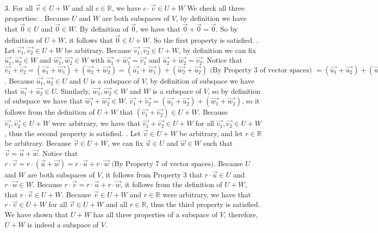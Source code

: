 \documentclass[12pt]{article}
\newenvironment{problem}[2][Problem]
{
	\begin{trivlist} 
		\item[\hskip \labelsep {\bfseries #1 #2:}]
	}
{
	\end{trivlist}
	}
\newenvironment{solution}[1][Solution]
{
	\begin{trivlist} 
		\item[\hskip \labelsep {\itshape #1:}]
	}
	{
	\end{trivlist}
}
\begin{document}
\begin{problem}{3}
\begin{solution}
3. For all $\vec{v} \in U+W$ and all $c \in \mathbb{R}$, we have $c\cdot \vec{v} \in U+W$
\noindent
\newline
\newline
We check all three properties:
\newline
{}. Because $U$ and $W$ are both subspaces of $V$, by definition we have that $\vec{0} \in U$ and $\vec{0} \in W$. By definition of $\vec{0}$, we have that $\vec{0} + \vec{0} = \vec{0}$. So by definition of $U+W$, it follows that $\vec{0} \in U+W$. So the first property is satisfied.
\newline
{}. Let $\vec{v_1},\vec{v_2} \in U+W$ be arbitrary. Because $\vec{v_1},\vec{v_2} \in U+W$, by definition we can fix $\vec{u_1},\vec{u_2} \in W$ and $\vec{w_1},\vec{w_2} \in W$ with $\vec{u_1} + \vec{w_1} = \vec{v_1}$ and $\vec{u_2} + \vec{w_2} = \vec{v_2}$. Notice that $
\vec{v_1} + \vec{v_2} =(\vec{u_1} + \vec{w_1}) + (\vec{u_2} + \vec{w_2}) = (\vec{u_1} + \vec{w_1}) + (\vec{w_2} + \vec{u_2}) \text{ (By Property 3 of vector spaces) } =(\vec{u_1} + \vec{u_2}) + (\vec{w_1} + \vec{w_2}) \text{ (By Property 4 of vector spaces)}$.
Because $\vec{u_1},\vec{u_2} \in U$ and $U$ is a subspace of $V$, by definition of subspace we have that $\vec{u_1}+\vec{u_2} \in U$. Similarly, $\vec{w_1},\vec{w_2} \in W$ and $W$ is a subspace of $V$, so by definition of subspace we have that $\vec{w_1}+\vec{w_2} \in W$. $\vec{v_1} + \vec{v_2} = (\vec{u_1} + \vec{u_2}) + (\vec{w_1} + \vec{w_2})$, so it follows from the definition of $U+W$ that $(\vec{v_1} + \vec{v_2}) \in U+W$. Because $\vec{v_1},\vec{v_2} \in U+W$ were arbitrary, we have that $\vec{v_1}+\vec{v_2} \in U+ W$ for all $\vec{v_1},\vec{v_2} \in U+ W$, thus the second property is satisfied.
\newline
{}. Let $\vec{v} \in U+W$ be arbitrary, and let $r \in \mathbb{R}$ be arbitrary. Because $\vec{v} \in U+W$, we can fix $\vec{u} \in U$ and $\vec{w} \in W$ such that $\vec{v} = \vec{u} + \vec{w}$. Notice that $r\cdot \vec{v} = r\cdot (\vec{u} + \vec{w}) = r\cdot \vec{u} + r\cdot \vec{w} \text{ (By Property 7 of vector spaces)}$. Because $U$ and $W$ are both subspaces of $V$, it follows from Property 3 that $r\cdot \vec{u} \in U$ and $r\cdot \vec{w} \in W$. Because $r\cdot \vec{v} =  r\cdot \vec{u} + r\cdot \vec{w}$, it follows from the definition of $U+W$, that $r\cdot \vec{v} \in U+W$. Because $\vec{v} \in U+W$ and $r\in \mathbb{R}$ were arbitrary, we have that $r\cdot \vec{v} \in U+W$ for all $\vec{v} \in U+W$ and all $r\in \mathbb{R}$, thus the third property is satisfied.
\noindent
\newline
\newline
We have shown that $U+W$ has all three properties of a subspace of $V$, therefore, $U+W$ is indeed a subspace of $V$.


\end{solution}
\end{problem}
\end{document}
